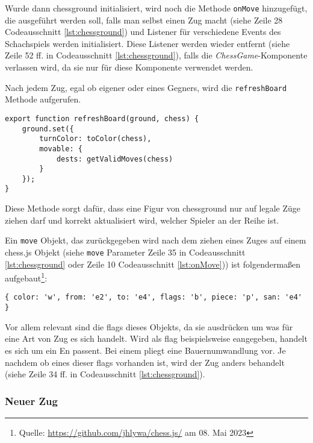 Wurde dann chessground initialisiert, wird noch die Methode \verb|onMove| hinzugefügt, die ausgeführt werden soll, falls man selbst einen Zug macht (siehe Zeile 28 Codeausschnitt \ref{lst:chessground}) und Listener für verschiedene Events des Schachspiels werden initialisiert. Diese Listener werden wieder entfernt (siehe Zeile 52 ff. in Codeausschnitt \ref{lst:chessground}), falls die \textit{ChessGame}-Komponente verlassen wird, da sie nur für diese Komponente verwendet werden.

Nach jedem Zug, egal ob eigener oder eines Gegners, wird die \verb|refreshBoard| Methode aufgerufen.

\begin{lstlisting}[style=codeStyle, caption={Die refreshBoard Methode}, label={lst:refreshBoard}]
export function refreshBoard(ground, chess) {
    ground.set({
        turnColor: toColor(chess),
        movable: {
            dests: getValidMoves(chess)
        }
    });
}
\end{lstlisting}

Diese Methode sorgt dafür, dass eine Figur von chessground nur auf legale Züge ziehen darf und korrekt aktualisiert wird, welcher Spieler an der Reihe ist.

Ein \verb|move| Objekt, das zurückgegeben wird nach dem ziehen eines Zuges auf einem chess.js Objekt (siehe \verb|move| Parameter Zeile 35 in Codeausschnitt \ref{lst:chessground} oder Zeile 10 Codeausschnitt \ref{lst:onMove})) ist folgendermaßen aufgebaut\footnote{Quelle: \url{https://github.com/jhlywa/chess.js/} am 08. Mai 2023}:
\begin{verbatim}
{ color: 'w', from: 'e2', to: 'e4', flags: 'b', piece: 'p', san: 'e4' }
\end{verbatim}
Vor allem relevant sind die flags dieses Objekts, da sie ausdrücken um was für eine Art von Zug es sich handelt. Wird als flag beispielsweise \glqq e\grqq{ }angegeben, handelt es sich um ein En passent. Bei einem \glqq p\grqq{ }liegt eine Bauernumwandlung vor.
Je nachdem ob eines dieser flags vorhanden ist, wird der Zug anders behandelt (siehe Zeile 34 ff. in Codeausschnitt \ref{lst:chessground}).

\subsubsection{Neuer Zug}

